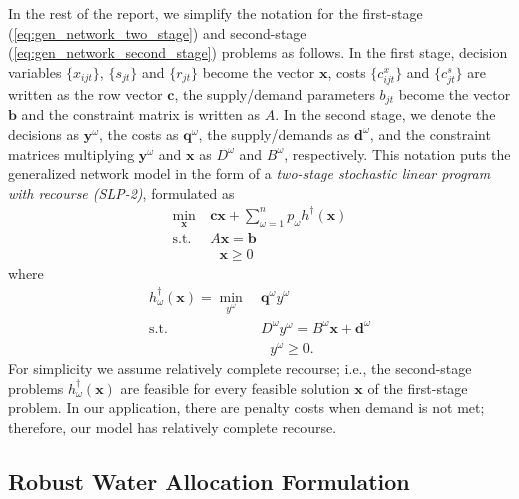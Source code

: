 \documentclass[12pt]{amsart}
\newcommand{\x}{\mathbf{x}}
\newcommand{\y}{\mathbf{y}}
\renewcommand{\c}{\mathbf{c}}
\newcommand{\q}{\mathbf{q}}
\renewcommand{\b}{\mathbf{b}}
\renewcommand{\d}{\mathbf{d}}
\newcommand{\st}{\mbox{s.t.}}
\begin{document}
In the rest of the report, we simplify the notation for the first-stage (\ref{eq:gen_network_two_stage}) and second-stage (\ref{eq:gen_network_second_stage}) problems as follows.
In the first stage, decision variables $\{x_{ijt}\}$, $\{s_{jt}\}$ and $\{r_{jt}\}$ become the vector $\x$, costs $\{c_{ijt}^x\}$ and $\{c_{jt}^s\}$ are written as the row vector $\c$, the supply/demand parameters $b_{jt}$ become the vector $\b$ and the constraint matrix is written as $A$.
In the second stage, we denote the decisions as $\y^\omega$, the costs as $\q^\omega$, the supply/demands as $\d^\omega$, and the constraint matrices multiplying $\y^\omega$ and $\x$ as $D^\omega$ and $B^\omega$, respectively.
This notation puts the generalized network model in the form of a {\it two-stage stochastic linear program with recourse (SLP-2)}, formulated as
\begin{align}
	\min_\x \ & \c\x + \sum_{\omega=1}^n p_\omega h^\dagger(\x) \label{eq:slp_first_stage} \\
	\st \ & A\x = \b \nonumber  \\
	&\ \ \ \x \geq 0 \nonumber
\end{align}
where
\begin{align}
	h^\dagger_\omega(\x) = \min_{y^\omega} \ & \q^\omega y^\omega \label{eq:slp_second_stage} \\
	\st \ & D^\omega y^\omega = B^\omega \x + \d^\omega \nonumber \\
	& \ \ \ y^\omega \geq 0. \nonumber
\end{align}
For simplicity we assume relatively complete recourse; i.e., the second-stage problems $h^\dagger_\omega(\x)$ are feasible for every feasible solution $\x$ of the first-stage problem. In our application, there are penalty costs when demand is not met; therefore, our model has relatively complete recourse. 


\subsection{Robust Water Allocation Formulation}
\label{sec:lrlp2}
\end{document}
